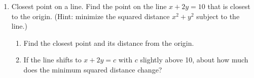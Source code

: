 \begin{enumerate}
\item[5.] Closest point on a line. Find the point on the line $x + 2y = 10$ that is closest to the origin. (Hint: minimize the squared distance $x^2 + y^2$ subject to the line.)
\begin{enumerate}
\item[(a)] Find the closest point and its distance from the origin.
\item[(b)] If the line shifts to $x + 2y = c$ with $c$ slightly above 10, about how much does the minimum squared distance change?
\end{enumerate}

\end{enumerate}
